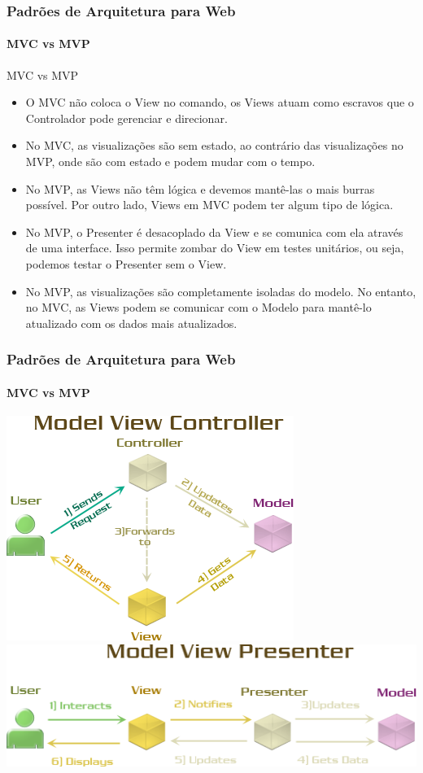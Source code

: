 \documentclass[
	10pt, %
	t, %
]{beamer}
\begin{document}
\begin{frame}
	\frametitle{Padrões de Arquitetura para Web}
	\framesubtitle{MVC vs MVP}

	\begin{block}{MVC vs MVP}
		\begin{itemize}
			\item O \alert{MVC} não coloca o View no comando, os Views atuam como escravos que o Controlador pode gerenciar e direcionar.
			\item No \alert{MVC}, as visualizações são sem estado, ao contrário das visualizações no MVP, onde são com estado e podem mudar com o tempo.
			\item No \alert{MVP}, as Views não têm lógica e devemos mantê-las o mais burras possível. Por outro lado, Views em MVC podem ter algum tipo de lógica.
			\item No \alert{MVP}, o Presenter é desacoplado da View e se comunica com ela através de uma interface. Isso permite zombar do View em testes unitários, ou seja, podemos testar o Presenter sem o View.
			\item No \alert{MVP}, as visualizações são completamente isoladas do modelo. No entanto, no MVC, as Views podem se comunicar com o Modelo para mantê-lo atualizado com os dados mais atualizados.
		\end{itemize}
	\end{block}

\end{frame}

\begin{frame}
	\frametitle{Padrões de Arquitetura para Web}
	\framesubtitle{MVC vs MVP}

	\centering
	\includegraphics[width=0.5\linewidth]{Images/mvc2.png}
	\includegraphics[width=0.8\linewidth]{Images/mvp2.png}

\end{frame}
\end{document}
